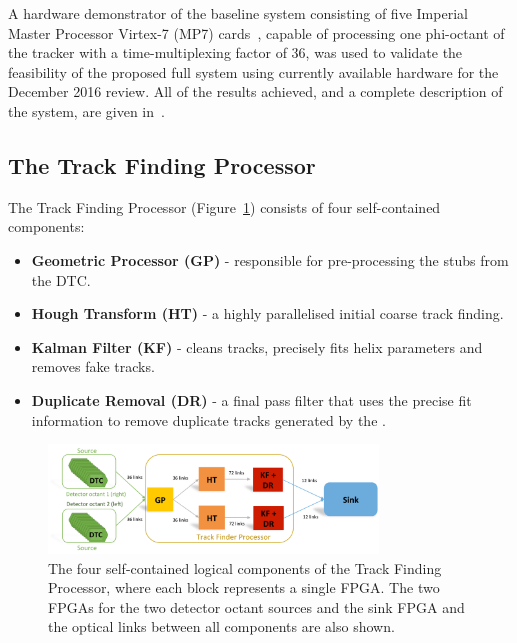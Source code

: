 A hardware demonstrator of the baseline system consisting of five Imperial Master Processor Virtex-7 (MP7) cards~\cite{mp7ref}, capable of processing one phi-octant of the tracker with a time-multiplexing factor of 36, was used to validate the feasibility of the proposed full system using currently available hardware for the December 2016 review.
All of the results achieved, and a complete description of the system, are given in~\cite{TMTT_JINST}.

\subsection{The Track Finding Processor}\label{subsec:TFP}
The Track Finding Processor (Figure~\ref{fig:TFP}) consists of four self-contained components:
\begin{itemize}
\item {\bf Geometric Processor (GP)} - responsible for pre-processing the stubs from the DTC.
\item {\bf Hough Transform (HT)} - a highly parallelised initial coarse track finding.
\item {\bf Kalman Filter (KF)} - cleans tracks, precisely fits helix parameters and removes fake tracks.
\item {\bf Duplicate Removal (DR)} - a final pass filter that uses the precise fit information to remove duplicate tracks generated by the \HT.
\end{itemize}

\begin{figure}[!h]
\centering
\includegraphics[width=0.78\textwidth]{figs/tk-upgrade/demoslice1.pdf}
\caption{The four self-contained logical components of the Track Finding Processor, where each block represents a single FPGA. The two FPGAs for the two detector octant sources and the sink FPGA and the optical links between all components are also shown.}
\label{fig:TFP}
\end{figure}

